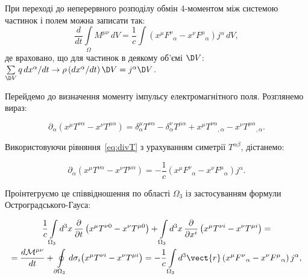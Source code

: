 При переході до неперервного розподілу обмін 4-моментом між системою частинок і полем можна записати так:
\begin{equation}\label{eq:dM_particles}
    \frac{d}{dt}\int\limits_{\Omega}M^{\mu\nu}\,dV
    = \frac{1}{c}\int\!\left(
    x^{\mu}F^{\nu}{}_{\alpha} - x^{\nu}F^{\mu}{}_{\alpha}
    \right)j^{\alpha}\,dV,
\end{equation}
де враховано, що для частинок в деякому об'ємі $\D V$: $\sum\limits_{\D V} q\,dx^{\alpha}/dt \to
\rho\,(dx^{\alpha}/dt)\,\D V = j^{\alpha}\D V$.

Перейдемо до визначення моменту імпульсу електромагнітного поля. Розглянемо вираз:

\begin{equation}\label{eq:divM_field}
    \partial_{\alpha}\!\left(x^{\mu}T^{\nu\alpha} - x^{\nu}T^{\mu\alpha}\right)
    = \delta^{\mu}_{\alpha}T^{\nu\alpha} - \delta^{\nu}_{\alpha}T^{\mu\alpha}
    + x^{\mu}T^{\nu\alpha}{}_{,\alpha} - x^{\nu}T^{\mu\alpha}{}_{,\alpha}.
\end{equation}


Використовуючи рівняння~\eqref{eq:divT} з урахуванням симетрії $T^{\alpha\beta}$, дістанемо:

\begin{equation}\label{eq:divM_result}
    \partial_{\alpha}\!\left(x^{\mu}T^{\nu\alpha} - x^{\nu}T^{\mu\alpha}\right)
    = -\frac{1}{c}\!\left(
    x^{\mu}F^{\nu}{}_{\alpha} - x^{\nu}F^{\mu}{}_{\alpha}
    \right)j^{\alpha}.
\end{equation}


Проінтегруємо це співвідношення по області $\Omega_3$ із застосуванням формули Остроградського-Гауса:

\begin{multline*}
    \frac{1}{c} \int\limits_{\Omega_3} d^3 x \,
    \frac{\partial}{\partial t}
    \left( x^\mu T^{\nu 0} - x^\nu T^{\mu 0} \right)
    + \int\limits_{\Omega_3} d^3 x \,
    \frac{\partial}{\partial x^i}
    \left( x^\mu T^{\nu i} - x^\nu T^{\mu i} \right) = \\
    =\frac{d\mathcal{M}^{\mu\nu}}{dt}
    + \oint\limits_{\partial\Omega_3}d\sigma_i\!\left(x^{\mu}T^{\nu i} - x^{\nu}T^{\mu i}\right)
    = -\frac{1}{c}\int\limits_{\Omega_3}d^3\vect{r}\,
    \!\left(x^{\mu}F^{\nu}{}_{\alpha} - x^{\nu}F^{\mu}{}_{\alpha}\right)j^{\alpha},
\end{multline*}

